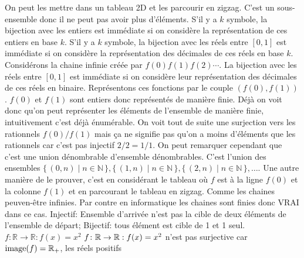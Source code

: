 \begin{mcqs}
  {On peut les mettre dans un tableau 2D et les parcourir en zigzag.}
  {C'est un sous-ensemble donc il ne peut pas avoir plus d'éléments.}
  {S'il y a $k$ symbole, la bijection avec les entiers est immédiate si on considère la représentation de ces entiers en base $k$.}
  {S'il y a $k$ symbole, la bijection avec les réels entre $[0,1]$ est immédiate si on considère la représentation des décimales de ces réels en base $k$.}
  {Considérons la chaine infinie créée par $f(0)f(1)f(2)\cdots$.
  La bijection avec les réels entre $[0,1]$ est immédiate si on considère leur représentation des décimales de ces réels en binaire.}
  {Représentons ces fonctions par le couple $(f(0),f(1))$.
  $f(0)$ et $f(1)$ sont entiers donc représentés de manière finie.
  Déjà on voit donc qu'on peut représenter les éléments de l'ensemble de manière finie, intuitivement c'est déjà énumérable.
  On voit tout de suite une surjection vers les rationnels $f(0)/f(1)$
  mais ça ne signifie pas qu'on a moins d'éléments que les rationnels car c'est pas injectif $2/2 = 1/1$.
  On peut remarquer cependant que c'est une union dénombrable d'ensemble dénombrables.
  C'est l'union des ensembles
  $\{\, (0,n) \mid n \in \mathbb{N} \,\},
   \{\, (1,n) \mid n \in \mathbb{N} \,\},
   \{\, (2,n) \mid n \in \mathbb{N} \,\},\ldots$.
  Une autre manière de le prouver, c'est en considérant le tableau où $f$ est à la ligne $f(0)$ et la colonne $f(1)$ et en parcourant le tableau en zigzag.}
  {Comme les chaines peuven-être infinies. Par contre en informatique les chaines sont finies donc VRAI dans ce cas.}
  {Injectif: Ensemble d'arrivée n'est pas la cible de deux éléments de l'ensemble de départ; Bijectif: tous élément est cible de 1 et 1 seul.}
  {$f\colon \mathbb{R}\rightarrow\mathbb{R} : f(x)=x^{2}$}
  {$f\colon \mathbb{R} \to \mathbb{R} : f(x) = x^2$ n'est pas surjective car $\mathop{\mathrm{image}}(f) = \mathbb{R}_+$, les réels positifs
}
\end{mcqs}
